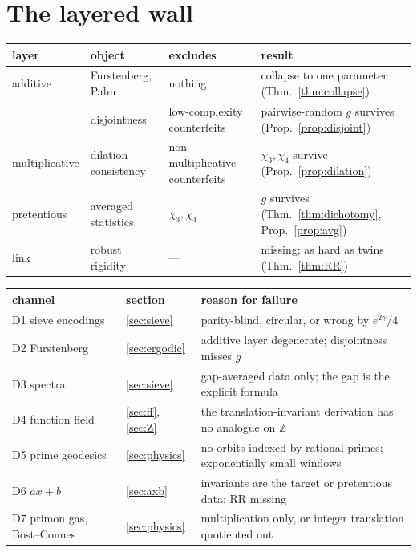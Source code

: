 \documentclass[11pt]{amsart}
\theoremstyle{definition}
\theoremstyle{remark}
\newcommand{\Z}{\mathbb{Z}}
\begin{document}
\section{The layered wall}\label{sec:wall}

\begin{center}\footnotesize
\begin{tabular}{llll}
\toprule
layer & object & excludes & result\\
\midrule
additive & Furstenberg, Palm & nothing & collapse to one parameter (Thm.~\ref{thm:collapse})\\
 & disjointness & low-complexity counterfeits & pairwise-random $g$ survives (Prop.~\ref{prop:disjoint})\\
multiplicative & dilation consistency & non-multiplicative counterfeits & $\chi_3,\chi_4$ survive (Prop.~\ref{prop:dilation})\\
pretentious & averaged statistics & $\chi_3,\chi_4$ & $g$ survives (Thm.~\ref{thm:dichotomy}, Prop.~\ref{prop:avg})\\
link & robust rigidity & --- & missing; as hard as twins (Thm.~\ref{thm:RR})\\
\bottomrule
\end{tabular}
\end{center}

\begin{center}\footnotesize
\begin{tabular}{lll}
\toprule
channel & section & reason for failure\\
\midrule
D1 sieve encodings & \ref{sec:sieve} & parity-blind, circular, or wrong by $e^{2\gamma}/4$\\
D2 Furstenberg & \ref{sec:ergodic} & additive layer degenerate; disjointness misses $g$\\
D3 spectra & \ref{sec:sieve} & gap-averaged data only; the gap is the explicit formula\\
D4 function field & \ref{sec:ff}, \ref{sec:Z} & the translation-invariant derivation has no analogue on $\Z$\\
D5 prime geodesics & \ref{sec:physics} & no orbits indexed by rational primes; exponentially small windows\\
D6 $ax+b$ & \ref{sec:axb} & invariants are the target or pretentious data; RR missing\\
D7 primon gas, Bost--Connes & \ref{sec:physics} & multiplication only, or integer translation quotiented out\\
\bottomrule
\end{tabular}
\end{center}
\end{document}
